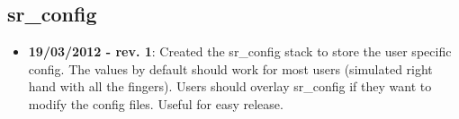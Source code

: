 
\subsection{sr\_config}
\label{sec:sr-config-changelog}

\begin{itemize}
\item \textbf{19/03/2012 - rev. 1}: Created the sr\_config stack to store the user specific config. The values by default should work for most users (simulated right hand with all the fingers). Users should overlay sr\_config if they want to modify the config files. Useful for easy release.
\end{itemize}